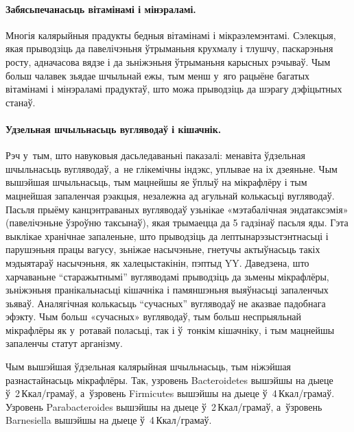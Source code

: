 \paragraph{Забясьпечанасьць вітамінамі і мінэраламі.}
Многія калярыйныя прадукты бедныя вітамінамі і мікраэлемэнтамі. Сэлекцыя, якая прыводзіць да павелічэньня ўтрыманьня крухмалу і тлушчу, паскарэньня росту, адначасова вядзе і да зьніжэньня ўтрыманьня карысных рэчываў. Чым больш чалавек зьядае шчыльнай ежы, тым менш у~яго рацыёне багатых вітамінамі і мінэраламі прадуктаў, што можа прыводзіць да шэрагу дэфіцытных станаў.


\paragraph{Удзельная шчыльнасьць вугляводаў і кішачнік.}
Рэч у~тым, што навуковыя дасьледаваньні паказалі: менавіта ўдзельная шчыльнасьць вугляводаў, а~не глікемічны індэкс, уплывае на іх дзеяньне. Чым вышэйшая шчыльнасьць, тым мацнейшы яе ўплыў на мікрафлёру і тым мацнейшая запаленчая рэакцыя, незалежна ад агульнай колькасьці вугляводаў. Пасьля прыёму канцэнтраваных вугляводаў узьнікае «мэтабалічная эндатаксэмія» (павелічэньне ўзроўню таксынаў), якая трымаецца да 5 гадзінаў пасьля яды. Гэта выклікае хранічнае запаленьне, што прыводзіць да лептынарэзыстэнтнасьці і парушэньня працы вагусу, зьніжае насычэньне, гнетучы актыўнасьць такіх мэдыятараў насычэньня, як халецыстакінін, пэптыд YY. Даведзена, што харчаваньне ``старажытнымі'' вугляводамі прыводзіць да зьмены мікрафлёры, зьніжэньня пранікальнасьці кішачніка і памяншэньня выяўнасьці запаленчых зьяваў. Аналягічная колькасьць ``сучасных'' вугляводаў не аказвае падобнага эфэкту. Чым больш «сучасных» вугляводаў, тым больш неспрыяльнай мікрафлёры як у~ротавай поласьці, так і ў~тонкім кішачніку, і тым мацнейшы запаленчы статут арганізму.

Чым вышэйшая ўдзельная калярыйная шчыльнасьць, тым ніжэйшая разнастайнасьць мікрафлёры. Так, узровень Bac\-te\-roidetes вышэйшы на дыеце ў~2\,Ккал/грамаў, а~ўзровень Firmicutes вышэйшы на дыеце ў~4\,Ккал/грамаў. Узровень Parabacteroides вышэйшы на дыеце ў~2\,Ккал/грамаў, а~ўзровень Barnesiella вышэйшы на дыеце ў~4\,Ккал/грамаў.

